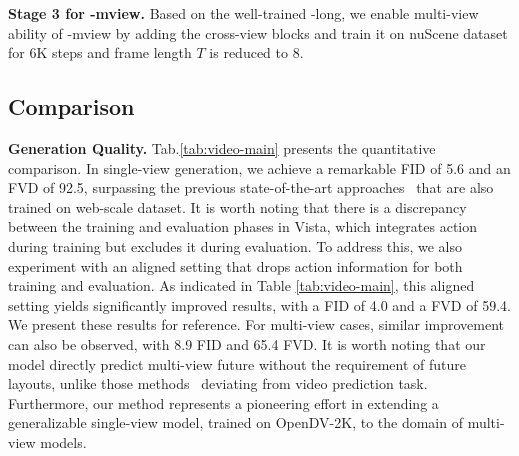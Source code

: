 \noindent \textbf{Stage 3 for \ourmethod-mview.}
Based on the well-trained \ourmethod-long, we enable multi-view ability of \ourmethod-mview by adding the cross-view blocks and train it on nuScene dataset for 6K steps and frame length $T$ is reduced to 8.




\subsection{Comparison}
\noindent\textbf{Generation Quality.}
Tab.\ref{tab:video-main} presents the quantitative comparison. In single-view generation, we achieve a remarkable FID of 5.6 and an FVD of 92.5, surpassing the previous state-of-the-art approaches~\cite{genad,vista} that are also trained on web-scale dataset. It is worth noting that there is a discrepancy between the training and evaluation phases in Vista, which integrates action during training but excludes it during evaluation. To address this, we also experiment with an aligned setting that drops action information for both training and evaluation. As indicated in Table \ref{tab:video-main}, this aligned setting yields significantly improved results, with a FID of 4.0 and a FVD of 59.4. We present these results for reference. For multi-view cases, similar improvement can also be observed, with 8.9 FID and 65.4 FVD. It is worth noting that our model directly predict multi-view future without the requirement of future layouts, unlike those methods~\cite{dive} deviating from video prediction task. Furthermore, our method represents a pioneering effort in extending a generalizable single-view model, trained on OpenDV-2K, to the domain of multi-view models.

